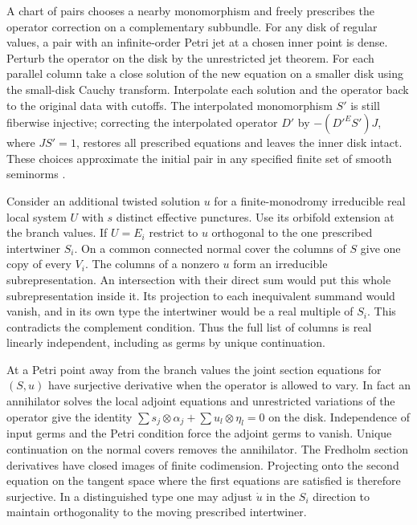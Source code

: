 A chart of pairs chooses a nearby monomorphism and freely prescribes the operator correction on a complementary subbundle. For any disk of regular values, a pair with an infinite-order Petri jet at a chosen inner point is dense. Perturb the operator on the disk by the unrestricted jet theorem. For each parallel column take a close solution of the new equation on a smaller disk using the small-disk Cauchy transform. Interpolate each solution and the operator back to the original data with cutoffs. The interpolated monomorphism \(S'\) is still fiberwise injective; correcting the interpolated operator \(D'\) by \(-(D'^{E}S')J\), where \(JS'=1\), restores all prescribed equations and leaves the inner disk intact. These choices approximate the initial pair in any specified finite set of smooth seminorms \cite[Definition~5.1 and Corollary~5.10]{wendl}.

Consider an additional twisted solution \(u\) for a finite-monodromy irreducible real local system \(U\) with \(s\) distinct effective punctures. Use its orbifold extension at the branch values. If \(U=E_i\) restrict to \(u\) orthogonal to the one prescribed intertwiner \(S_i\). On a common connected normal cover the columns of \(S\) give one copy of every \(V_i\). The columns of a nonzero \(u\) form an irreducible subrepresentation. An intersection with their direct sum would put this whole subrepresentation inside it. Its projection to each inequivalent summand would vanish, and in its own type the intertwiner would be a real multiple of \(S_i\). This contradicts the complement condition. Thus the full list of columns is real linearly independent, including as germs by unique continuation.

At a Petri point away from the branch values the joint section equations for \((S,u)\) have surjective derivative when the operator is allowed to vary. In fact an annihilator solves the local adjoint equations and unrestricted variations of the operator give the identity \(\sum s_j\otimes\alpha_j+\sum u_l\otimes\eta_l=0\) on the disk. Independence of input germs and the Petri condition force the adjoint germs to vanish. Unique continuation on the normal covers removes the annihilator. The Fredholm section derivatives have closed images of finite codimension. Projecting onto the second equation on the tangent space where the first equations are satisfied is therefore surjective. In a distinguished type one may adjust \(\dot u\) in the \(S_i\) direction to maintain orthogonality to the moving prescribed intertwiner.

